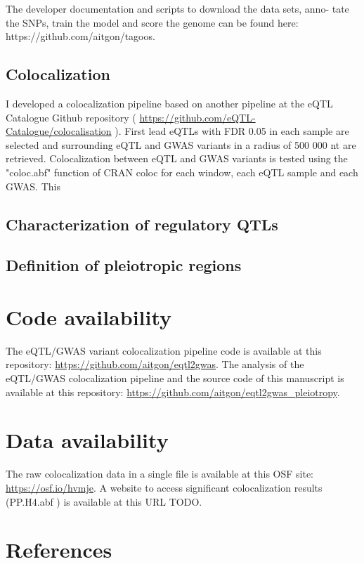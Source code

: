 %
The developer documentation and scripts to download the data sets, anno-
tate the SNPs, train the model and score the genome can be
found here: https://github.com/aitgon/tagoos.


\subsection*{Colocalization}

I developed a colocalization pipeline based on another pipeline at the eQTL Catalogue Github repository ( \url{https://github.com/eQTL-Catalogue/colocalisation} ).
%
First lead eQTLs with FDR 0.05 in each sample are selected and surrounding eQTL and GWAS variants in a radius of 500 000 nt are retrieved.
%
Colocalization between eQTL and GWAS variants is tested using the "coloc.abf" function of CRAN coloc for each window, each eQTL sample and each GWAS.
%
This 

\subsection*{Characterization of regulatory QTLs}


\subsection*{Definition of pleiotropic regions}

\section*{Code availability}

The eQTL/GWAS variant colocalization pipeline code is available at this repository: \url{https://github.com/aitgon/eqtl2gwas}.
%
The analysis of the eQTL/GWAS colocalization pipeline and the source code of this manuscript is available at this repository: \url{https://github.com/aitgon/eqtl2gwas_pleiotropy}.

\section*{Data availability}

The raw colocalization data in a single file is available at this OSF site: \url{https://osf.io/hvmje}.
%
A website to access significant colocalization results (PP.H4.abf ) is available at this URL TODO.


\section*{References}




